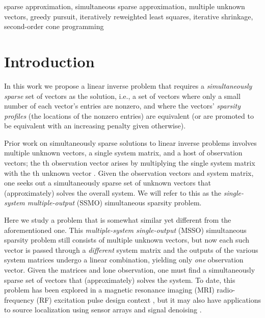 \documentclass[final]{siamltex}
\begin{document}
\begin{keywords} 
sparse approximation, simultaneous sparse approximation, multiple
unknown vectors, greedy pursuit, iteratively reweighted least
squares, iterative shrinkage, second-order cone programming
\end{keywords}

\pagestyle{myheadings}
\thispagestyle{plain}

\section{Introduction}
\label{sec:introduction}

  In this work we propose a linear inverse problem that requires a
  {\em{simultaneously sparse}} set of vectors as the solution, i.e., a
  set of vectors where only a small number of each vector's entries
  are nonzero, and where the vectors' {\em{sparsity profiles}} (the
  locations of the nonzero entries) are equivalent (or are promoted to
  be equivalent with an increasing penalty given otherwise).

  Prior work on simultaneously sparse solutions to linear inverse
  problems involves multiple unknown vectors, a single system matrix,
  and a host of observation vectors; the th observation vector
  arises by multiplying the single system matrix with the th
  unknown vector \cite{Cot2005,Mal2005,Tro2006_I,Tro2006_II}.  Given
  the observation vectors and system matrix, one seeks out a
  simultaneously sparse set of unknown vectors that (approximately)
  solves the overall system.  We will refer to this as the
  {\em{single-system multiple-output}} (SSMO) simultaneous sparsity
  problem.

  Here we study a problem that is somewhat similar yet
  different from the aforementioned one.  This {\em{multiple-system
  single-output}} (MSSO) simultaneous sparsity problem still consists
  of multiple unknown vectors, but now each such vector is passed
  through a {\em{different}} system matrix and the outputs of the
  various system matrices undergo a linear combination, yielding only
  {\em{one}} observation vector.  Given the matrices and lone
  observation, one must find a simultaneously sparse set of vectors
  that (approximately) solves the system.  To date, this problem has
  been explored in a magnetic resonance imaging (MRI) radio-frequency
  (RF) excitation pulse design context
  \cite{Zel2007,Zel2008_CISS,Zel2008_TMI}, but it may also have
  applications to source localization using sensor arrays
  \cite{Joh1993, Kri1996} and signal denoising
  \cite{Don1995,Che1998,Fle2006,Ela2006}.
\end{document}
